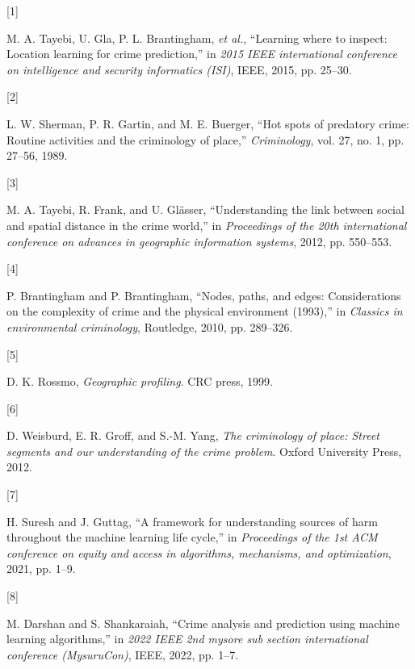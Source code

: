 \documentclass[conference,final, 10pt]{IEEEtran}
\newlength{\cslhangindent}
\newlength{\csllabelwidth}
\newenvironment{CSLReferences}[2] %
 {\begin{list}{}{%
  \setlength{\itemindent}{0pt}
  \setlength{\leftmargin}{0pt}
  \setlength{\parsep}{0pt}
  \ifodd #1
   \setlength{\leftmargin}{\cslhangindent}
   \setlength{\itemindent}{-1\cslhangindent}
  \fi
  \setlength{\itemsep}{#2\baselineskip}}}
 {\end{list}}
\newcommand{\CSLLeftMargin}[1]{\parbox[t]{\csllabelwidth}{#1}}
\newcommand{\CSLRightInline}[1]{\parbox[t]{\linewidth - \csllabelwidth}{#1}\break}
\begin{document}
\label{refs}
\begin{CSLReferences}{0}{0}
\CSLLeftMargin{{[}1{]} }%
\CSLRightInline{M. A. Tayebi, U. Gla, P. L. Brantingham, \emph{et al.},
{``Learning where to inspect: Location learning for crime prediction,''}
in \emph{2015 IEEE international conference on intelligence and security
informatics (ISI)}, IEEE, 2015, pp. 25--30.}

\CSLLeftMargin{{[}2{]} }%
\CSLRightInline{L. W. Sherman, P. R. Gartin, and M. E. Buerger, {``Hot
spots of predatory crime: Routine activities and the criminology of
place,''} \emph{Criminology}, vol. 27, no. 1, pp. 27--56, 1989.}

\CSLLeftMargin{{[}3{]} }%
\CSLRightInline{M. A. Tayebi, R. Frank, and U. Glässer, {``Understanding
the link between social and spatial distance in the crime world,''} in
\emph{Proceedings of the 20th international conference on advances in
geographic information systems}, 2012, pp. 550--553.}

\CSLLeftMargin{{[}4{]} }%
\CSLRightInline{P. Brantingham and P. Brantingham, {``Nodes, paths, and
edges: Considerations on the complexity of crime and the physical
environment (1993),''} in \emph{Classics in environmental criminology},
Routledge, 2010, pp. 289--326.}

\CSLLeftMargin{{[}5{]} }%
\CSLRightInline{D. K. Rossmo, \emph{Geographic profiling}. CRC press,
1999.}

\CSLLeftMargin{{[}6{]} }%
\CSLRightInline{D. Weisburd, E. R. Groff, and S.-M. Yang, \emph{The
criminology of place: Street segments and our understanding of the crime
problem}. Oxford University Press, 2012.}

\CSLLeftMargin{{[}7{]} }%
\CSLRightInline{H. Suresh and J. Guttag, {``A framework for
understanding sources of harm throughout the machine learning life
cycle,''} in \emph{Proceedings of the 1st ACM conference on equity and
access in algorithms, mechanisms, and optimization}, 2021, pp. 1--9.}

\CSLLeftMargin{{[}8{]} }%
\CSLRightInline{M. Darshan and S. Shankaraiah, {``Crime analysis and
prediction using machine learning algorithms,''} in \emph{2022 IEEE 2nd
mysore sub section international conference (MysuruCon)}, IEEE, 2022,
pp. 1--7.}


\end{CSLReferences}
\end{document}
